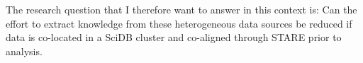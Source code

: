 \documentclass[a4paper,10pt]{article}
\begin{document}
The research question that I therefore want to answer in this context is:
Can the effort to extract knowledge from these heterogeneous data sources be reduced
if data is co-located in a SciDB cluster and co-aligned through STARE prior to analysis.




%
%
%


\printbibliography 
\end{document}
